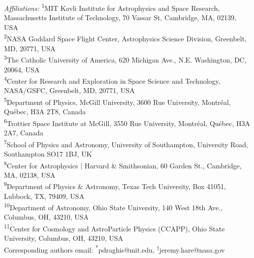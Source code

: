 \documentclass{article}
\begin{document}
     \normalsize   \noindent
    {\it Affiliations:} \textsuperscript{1}MIT Kavli Institute for Astrophysics and Space Research, Massachusetts Institute of Technology, 70 Vassar St, Cambridge, MA, 02139, USA\\
    \textsuperscript{2}NASA Goddard Space Flight Center, Astrophysics Science Division, Greenbelt, MD, 20771, USA\\
    \textsuperscript{3}The Catholic University of America, 620 Michigan Ave., N.E. Washington, DC, 20064, USA\\
    \textsuperscript{4}Center for Research and Exploration in Space Science and Technology, NASA/GSFC, Greenbelt, MD, 20771, USA\\
    \textsuperscript{5}Department of Physics, McGill University, 3600 Rue University, Montréal, Québec, H3A 2T8, Canada\\
    \textsuperscript{6}Trottier Space Institute at McGill, 3550 Rue University, Montréal, Québec, H3A 2A7, Canada\\
    \textsuperscript{7}School of Physics and Astronomy, University of Southampton, University Road, Southampton SO17 1BJ, UK\\
    \textsuperscript{8}Center for Astrophysics $\vert$ Harvard \& Smithsonian, 60 Garden St., Cambridge, MA, 02138, USA\\
    \textsuperscript{9}Department of Physics \& Astronomy, Texas Tech University, Box 41051, Lubbock, TX, 79409, USA\\
    \textsuperscript{10}Department of Astronomy, Ohio State University, 140 West 18th Ave., Columbus, OH, 43210, USA\\
    \textsuperscript{11}Center for Cosmology and AstroParticle Physics (CCAPP), Ohio State University, Columbus, OH, 43210, USA\\
    Corresponding authors email: \textsuperscript{*}pdraghis@mit.edu, \textsuperscript{$\dagger$}jeremy.hare@nasa.gov

\vspace*{0.2cm}
\end{document}
